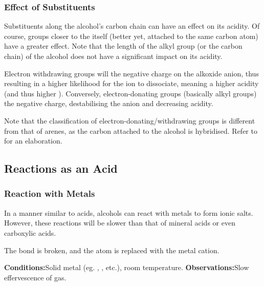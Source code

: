 			\subsubsection{Effect of Substituents}

				Substituents along the alcohol's carbon chain can have an effect on its acidity. Of course, groups closer to the 
				itself (better yet, attached to the same carbon atom) have a greater effect. Note that the length of the alkyl group
				(or the carbon chain) of the alcohol does not have a significant impact on its acidity.

				Electron withdrawing groups will  the negative charge on the alkoxide anion, thus resulting in a higher
				likelihood for the  ion to dissociate, meaning a higher acidity (and thus higher \Ka). Conversely, electron-donating
				groups (basically alkyl groups)  the negative charge, destabilising the anion and decreasing acidity.

				Note that the classification of electron-donating/withdrawing groups is different from that of arenes, as the carbon
				attached to the alcohol is \spthree{} hybridised. Refer to \hyperlink{CaveatResonanceTable}{} for an
				elaboration.



		\pagebreak
		\subsection{Reactions as an Acid}

			\subsubsection{Reaction with Metals}
				In a manner similar to acids, alcohols can react with  metals to form ionic salts. However, these reactions
				will be slower than that of mineral acids or even carboxylic acids.

				The  bond is broken, and the  atom is replaced with the metal cation.


				\vspace{1.5em}
				\vbox{\textbf{Conditions:}\tabto{35mm}Solid metal (eg. , , etc.), room temperature.}
				\vbox{\textbf{Observations:}\tabto{35mm}Slow effervescence of  gas.}


